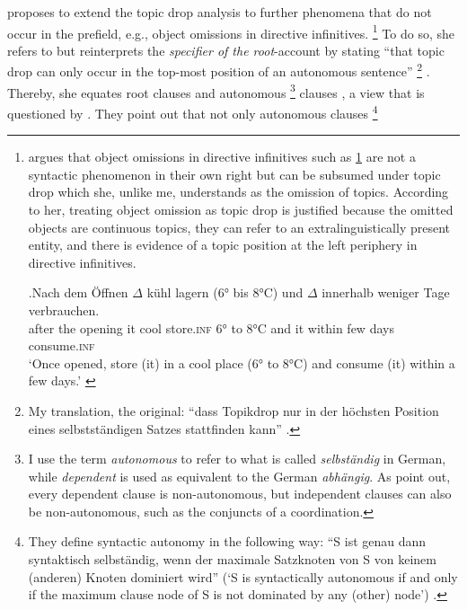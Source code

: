 \citet{freywald2020} proposes to extend the topic drop analysis to further phenomena that do not occur in the prefield, e.g., object omissions  in directive infinitives.%
\footnote{\citet{freywald2020} argues that object omissions  in directive infinitives such as \ref{ex:object.omission} are not a syntactic phenomenon in their own right but can be subsumed under topic drop which she, unlike me, understands as the omission of topics.
According to her, treating object omission as topic drop is justified because the omitted objects are continuous topics, they can refer to an extralinguistically present entity, and there is evidence of a topic position at the left periphery in directive infinitives.

\exg.\label{ex:object.omission}Nach dem Öffnen $\Delta$ kühl lagern (6° bis 8°C) und $\Delta$ innerhalb weniger Tage verbrauchen.\\
after the opening it cool store.\textsc{inf} 6° to 8°C and it within few days consume.\textsc{inf}\\
`Once opened, store (it) in a cool place (6° to 8°C) and consume (it) within a few days.' \citep[148]{freywald2020}
\vspace{-0.75\baselineskip}
}
To do so, she refers to \citet{rizzi1994} but reinterprets the \textit{specifier of the root}-account by stating ``that topic drop can only occur in the top-most position of an autonomous sentence''%
\footnote{My translation, the original: ``dass Topikdrop nur in der höchsten Position eines selbstständigen Satzes stattfinden kann'' \citep[167]{freywald2020}.}
%
\citep[167]{freywald2020}.
Thereby, she equates root clauses and autonomous%
\footnote{I use the term \textit{autonomous} to refer to what is called \textit{selbständig} in German, while \textit{dependent} is used as equivalent to the German \textit{abhängig}.
As \citet[541]{reich.reis2013} point out, every dependent clause is non-autonomous, but independent clauses can also be non-autonomous, such as the conjuncts of a coordination.}
%
clauses \citep[150]{freywald2020}, a view that is questioned by \citet{reich.reis2013}.
They point out that not only autonomous clauses%
\footnote{They define syntactic autonomy in the following way:
``S ist genau dann syntaktisch selbständig, wenn der maximale Satzknoten von S von keinem (anderen) Knoten dominiert wird'' (`S is syntactically autonomous if and only if the maximum clause node of S is not dominated by any (other) node') \citep[541, my translation]{reich.reis2013}.}
